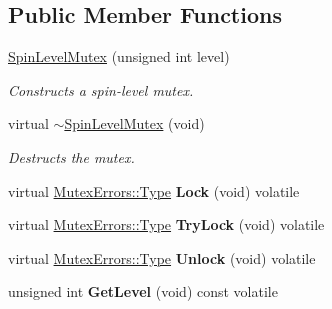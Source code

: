 \subsection*{Public Member Functions}
\begin{DoxyCompactItemize}
\item 
\hypertarget{classLoki_1_1SpinLevelMutex_a89f6e3f88dd10a5940d53764cf0f29b5}{}\hyperlink{classLoki_1_1SpinLevelMutex_a89f6e3f88dd10a5940d53764cf0f29b5}{Spin\+Level\+Mutex} (unsigned int level)\label{classLoki_1_1SpinLevelMutex_a89f6e3f88dd10a5940d53764cf0f29b5}

\begin{DoxyCompactList}\small\item\em Constructs a spin-\/level mutex. \end{DoxyCompactList}\item 
\hypertarget{classLoki_1_1SpinLevelMutex_a7740e7e636a9513d73891aa874a00777}{}virtual \hyperlink{classLoki_1_1SpinLevelMutex_a7740e7e636a9513d73891aa874a00777}{$\sim$\+Spin\+Level\+Mutex} (void)\label{classLoki_1_1SpinLevelMutex_a7740e7e636a9513d73891aa874a00777}

\begin{DoxyCompactList}\small\item\em Destructs the mutex. \end{DoxyCompactList}\item 
\hypertarget{classLoki_1_1SpinLevelMutex_a77d9d3b6baab0185750e26f3fe5ad914}{}virtual \hyperlink{classLoki_1_1MutexErrors_acd0eb6065ca303083d2e0229d7bff590}{Mutex\+Errors\+::\+Type} {\bfseries Lock} (void) volatile\label{classLoki_1_1SpinLevelMutex_a77d9d3b6baab0185750e26f3fe5ad914}

\item 
\hypertarget{classLoki_1_1SpinLevelMutex_a722f2ecc002bc06a56191babef96cf20}{}virtual \hyperlink{classLoki_1_1MutexErrors_acd0eb6065ca303083d2e0229d7bff590}{Mutex\+Errors\+::\+Type} {\bfseries Try\+Lock} (void) volatile\label{classLoki_1_1SpinLevelMutex_a722f2ecc002bc06a56191babef96cf20}

\item 
\hypertarget{classLoki_1_1SpinLevelMutex_ae7d2ee05c4fc87ee58dc07db630863c8}{}virtual \hyperlink{classLoki_1_1MutexErrors_acd0eb6065ca303083d2e0229d7bff590}{Mutex\+Errors\+::\+Type} {\bfseries Unlock} (void) volatile\label{classLoki_1_1SpinLevelMutex_ae7d2ee05c4fc87ee58dc07db630863c8}

\item 
\hypertarget{classLoki_1_1SpinLevelMutex_a1f0f467488151c59acae91530f22220a}{}unsigned int {\bfseries Get\+Level} (void) const  volatile\label{classLoki_1_1SpinLevelMutex_a1f0f467488151c59acae91530f22220a}

\end{DoxyCompactItemize}


